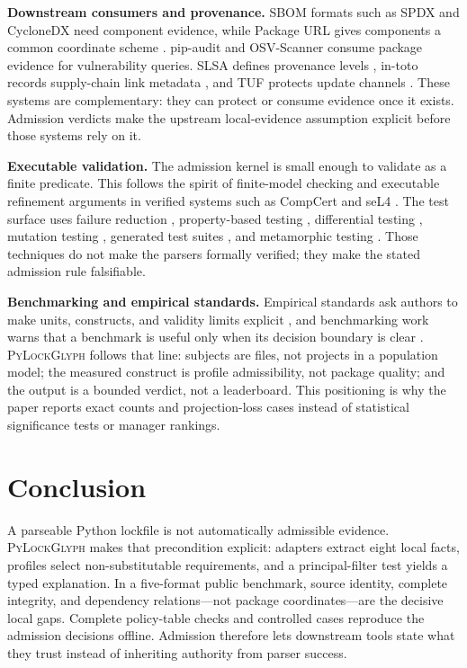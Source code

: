 \documentclass[10pt,conference]{IEEEtran}
\newcommand{\tool}{\textsc{PyLockGlyph}}
\begin{document}
\textbf{Downstream consumers and provenance.} SBOM formats such as SPDX \cite{spdxSpec} and CycloneDX \cite{cyclonedxPythonDocs} need component evidence, while Package URL gives components a common coordinate scheme \cite{purlSpec}. pip-audit \cite{pipAuditDocs} and OSV-Scanner \cite{osvScannerDocs} consume package evidence for vulnerability queries. SLSA defines provenance levels \cite{slsaSpec}, in-toto records supply-chain link metadata \cite{torresarias2019intoto}, and TUF protects update channels \cite{samuel2010tuf}. These systems are complementary: they can protect or consume evidence once it exists. Admission verdicts make the upstream local-evidence assumption explicit before those systems rely on it.

\textbf{Executable validation.} The admission kernel is small enough to validate as a finite predicate. This follows the spirit of finite-model checking \cite{holzmann1997model,clarke1999model} and executable refinement arguments in verified systems such as CompCert \cite{leroy2009formal} and seL4 \cite{klein2009sel4}. The test surface uses failure reduction \cite{zeller2002simplifying}, property-based testing \cite{claessen2000quickcheck}, differential testing \cite{yang2011csmith}, mutation testing \cite{jia2011mutation}, generated test suites \cite{fraser2011evosuite}, and metamorphic testing \cite{segura2016metamorphic}. Those techniques do not make the parsers formally verified; they make the stated admission rule falsifiable.

\textbf{Benchmarking and empirical standards.} Empirical standards ask authors to make units, constructs, and validity limits explicit \cite{ralph2021sigsoft}, and benchmarking work warns that a benchmark is useful only when its decision boundary is clear \cite{hasselbring2021benchmarking}. \tool{} follows that line: subjects are files, not projects in a population model; the measured construct is profile admissibility, not package quality; and the output is a bounded verdict, not a leaderboard. This positioning is why the paper reports exact counts and projection-loss cases instead of statistical significance tests or manager rankings.

\section{Conclusion}
A parseable Python lockfile is not automatically admissible evidence. \tool{} makes that precondition explicit: adapters extract eight local facts, profiles select non-substitutable requirements, and a principal-filter test yields a typed explanation. In a five-format public benchmark, source identity, complete integrity, and dependency relations---not package coordinates---are the decisive local gaps. Complete policy-table checks and \ControlledCases{} controlled cases reproduce the admission decisions offline. Admission therefore lets downstream tools state what they trust instead of inheriting authority from parser success.
\end{document}

